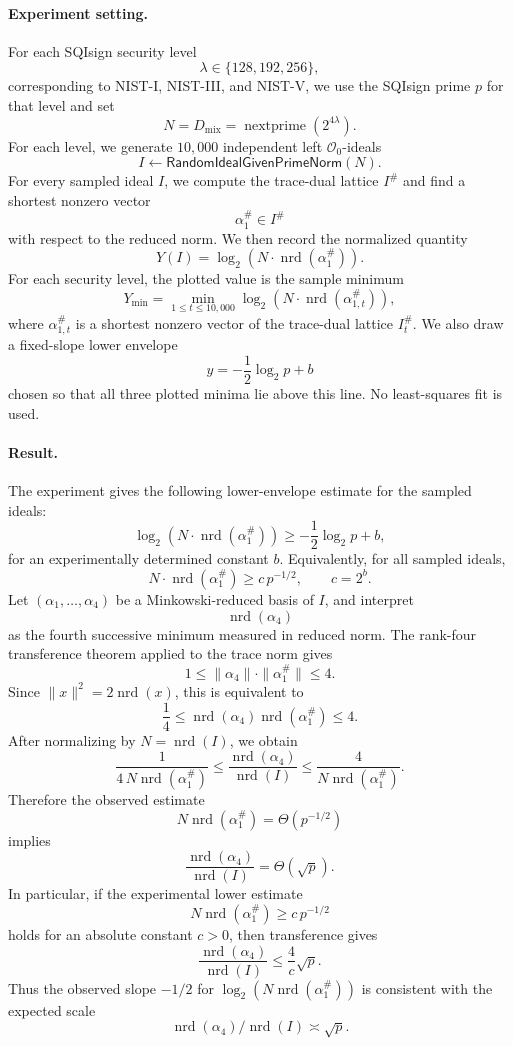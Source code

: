 \paragraph{Experiment setting.}
For each SQIsign security level
\[
\lambda\in\{128,192,256\},
\]
corresponding to NIST-I, NIST-III, and NIST-V, we use the SQIsign prime
\(p\) for that level and set
\[
N=D_{\mathrm{mix}}=\operatorname{nextprime}(2^{4\lambda}).
\]
For each level, we generate \(10{,}000\) independent left
\(\mathcal O_0\)-ideals
\[
I\leftarrow \mathsf{RandomIdealGivenPrimeNorm}(N).
\]
For every sampled ideal \(I\), we compute the trace-dual lattice \(I^\#\)
and find a shortest nonzero vector
\[
\alpha_1^\#\in I^\#
\]
with respect to the reduced norm.  We then record the normalized quantity
\[
Y(I)=
\log_2\!\left(
N\cdot \operatorname{nrd}(\alpha_1^\#)
\right).
\]
For each security level, the plotted value is the sample minimum
\[
Y_{\min}
=
\min_{1\le t\le 10{,}000}
\log_2\!\left(
N\cdot \operatorname{nrd}(\alpha_{1,t}^\#)
\right),
\]
where \(\alpha_{1,t}^\#\) is a shortest nonzero vector of the trace-dual
lattice \(I_t^\#\).  We also draw a fixed-slope lower envelope
\[
y=-\frac12\log_2 p+b
\]
chosen so that all three plotted minima lie above this line.  No
least-squares fit is used.

\paragraph{Result.}
The experiment gives the following lower-envelope estimate for the sampled
ideals:
\[
\log_2\!\left(
N\cdot \operatorname{nrd}(\alpha_1^\#)
\right)
\ge
-\frac12\log_2 p+b,
\]
for an experimentally determined constant \(b\).  Equivalently, for all
sampled ideals,
\[
N\cdot \operatorname{nrd}(\alpha_1^\#)
\ge
c\,p^{-1/2},
\qquad
c=2^b.
\]
Let \((\alpha_1,\ldots,\alpha_4)\) be a Minkowski-reduced basis of \(I\),
and interpret
\[
\operatorname{nrd}(\alpha_4)
\]
as the fourth successive minimum measured in reduced norm.  The rank-four
transference theorem applied to the trace norm gives
\[
1\le
\|\alpha_4\|\cdot \|\alpha_1^\#\|
\le 4.
\]
Since \(\|x\|^2=2\operatorname{nrd}(x)\), this is equivalent to
\[
\frac14
\le
\operatorname{nrd}(\alpha_4)\operatorname{nrd}(\alpha_1^\#)
\le
4.
\]
After normalizing by \(N=\operatorname{nrd}(I)\), we obtain
\[
\frac{1}{4\,N\operatorname{nrd}(\alpha_1^\#)}
\le
\frac{\operatorname{nrd}(\alpha_4)}{\operatorname{nrd}(I)}
\le
\frac{4}{N\operatorname{nrd}(\alpha_1^\#)}.
\]
Therefore the observed estimate
\[
N\operatorname{nrd}(\alpha_1^\#)=\Theta(p^{-1/2})
\]
implies
\[
\frac{\operatorname{nrd}(\alpha_4)}{\operatorname{nrd}(I)}
=
\Theta(\sqrt p).
\]
In particular, if the experimental lower estimate
\[
N\operatorname{nrd}(\alpha_1^\#)\ge c\,p^{-1/2}
\]
holds for an absolute constant \(c>0\), then transference gives
\[
\frac{\operatorname{nrd}(\alpha_4)}{\operatorname{nrd}(I)}
\le
\frac{4}{c}\sqrt p.
\]
Thus the observed slope \(-1/2\) for
\(\log_2(N\operatorname{nrd}(\alpha_1^\#))\) is consistent with the
expected scale
\[
\operatorname{nrd}(\alpha_4)/\operatorname{nrd}(I)
\asymp
\sqrt p.
\]

